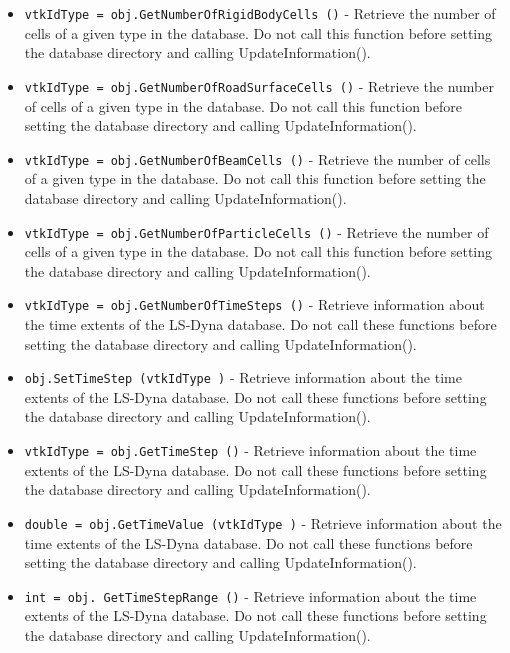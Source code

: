 \begin{itemize}
\item  \verb|vtkIdType = obj.GetNumberOfRigidBodyCells ()| -  Retrieve the number of cells of a given type in the database.  Do not
 call this function before setting the database directory and calling
 UpdateInformation().

\item  \verb|vtkIdType = obj.GetNumberOfRoadSurfaceCells ()| -  Retrieve the number of cells of a given type in the database.  Do not
 call this function before setting the database directory and calling
 UpdateInformation().

\item  \verb|vtkIdType = obj.GetNumberOfBeamCells ()| -  Retrieve the number of cells of a given type in the database.
 Do not call this function before setting the database directory and calling UpdateInformation().

\item  \verb|vtkIdType = obj.GetNumberOfParticleCells ()| -  Retrieve the number of cells of a given type in the database.  Do not
 call this function before setting the database directory and calling
 UpdateInformation().

\item  \verb|vtkIdType = obj.GetNumberOfTimeSteps ()| -  Retrieve information about the time extents of the LS-Dyna database.
 Do not call these functions before setting the database directory and
 calling UpdateInformation().

\item  \verb|obj.SetTimeStep (vtkIdType )| -  Retrieve information about the time extents of the LS-Dyna database.
 Do not call these functions before setting the database directory and
 calling UpdateInformation().

\item  \verb|vtkIdType = obj.GetTimeStep ()| -  Retrieve information about the time extents of the LS-Dyna database.
 Do not call these functions before setting the database directory and
 calling UpdateInformation().

\item  \verb|double = obj.GetTimeValue (vtkIdType )| -  Retrieve information about the time extents of the LS-Dyna database.
 Do not call these functions before setting the database directory and
 calling UpdateInformation().

\item  \verb|int = obj. GetTimeStepRange ()| -  Retrieve information about the time extents of the LS-Dyna database.
 Do not call these functions before setting the database directory and
 calling UpdateInformation().


\end{itemize}
